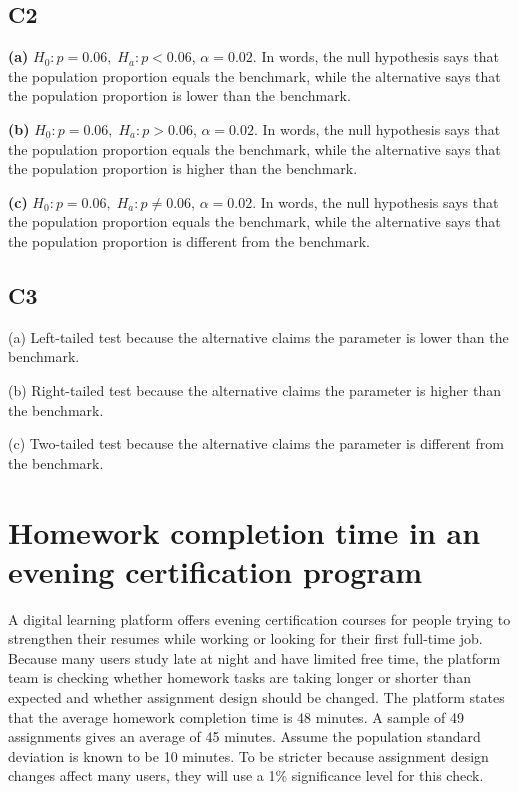 		\subsection*{C2}
		\textbf{(a)} \(H_0\colon p=0.06,\; H_a\colon p<0.06\), \(\alpha=0.02\). In words, the null hypothesis says that the population proportion equals the benchmark, while the alternative says that the population proportion is lower than the benchmark.
		
		\textbf{(b)} \(H_0\colon p=0.06,\; H_a\colon p>0.06\), \(\alpha=0.02\). In words, the null hypothesis says that the population proportion equals the benchmark, while the alternative says that the population proportion is higher than the benchmark.
		
		\textbf{(c)} \(H_0\colon p=0.06,\; H_a\colon p\ne 0.06\), \(\alpha=0.02\). In words, the null hypothesis says that the population proportion equals the benchmark, while the alternative says that the population proportion is different from the benchmark.
		
		\subsection*{C3}
		(a) Left-tailed test because the alternative claims the parameter is lower than the benchmark.\LeftTailGraph
		
		(b) Right-tailed test because the alternative claims the parameter is higher than the benchmark.\RightTailGraph
		
		(c) Two-tailed test because the alternative claims the parameter is different from the benchmark.\TwoTailGraph
		

	\section{Homework completion time in an evening certification program}
		A digital learning platform offers evening certification courses for people trying to strengthen their resumes while working or looking for their first full-time job. Because many users study late at night and have limited free time, the platform team is checking whether homework tasks are taking longer or shorter than expected and whether assignment design should be changed. The platform states that the average homework completion time is 48 minutes. A sample of 49 assignments gives an average of 45 minutes. Assume the population standard deviation is known to be 10 minutes. To be stricter because assignment design changes affect many users, they will use a 1\% significance level for this check.
		
